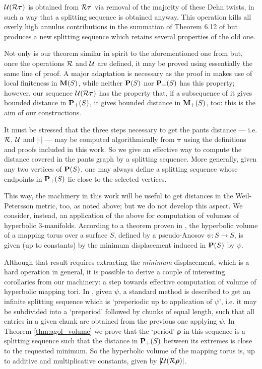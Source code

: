 ${\mathcal U}({\mathcal R}\bm\tau)$ is obtained from ${\mathcal R}\bm\tau$ via removal of the majority of these Dehn twists, in such a way that a splitting sequence is obtained anyway. This operation kills all overly high annulus contributions in the summation of Theorem 6.12 of \cite{masurminskyii} but produces a new splitting sequence which retains several properties of the old one.

Not only is our theorem similar in spirit to the aforementioned one from \cite{mms} but, once the operations ${\mathcal R}$ and ${\mathcal U}$ are defined, it may be proved using essentially the same line of proof. A major adaptation is necessary as the proof in \cite{mms} makes use of local finiteness in $\mathbf M(S)$, while neither $\mathbf P(S)$ nor ${\mathbf{P}_+}(S)$ has this property; however, our sequence ${\mathcal U}({\mathcal R}\bm\tau)$ has the property that, if a subsequence of it gives bounded distance in ${\mathbf{P}_+}(S)$, it gives bounded distance in ${\mathbf{M}_+}(S)$, too: this is the aim of our constructions.

It must be stressed that the three steps necessary to get the pants distance --- i.e. ${\mathcal R}$, ${\mathcal U}$ and $|\cdot|$ --- may be computed algorithmically from $\bm\tau$ using the definitions and proofs included in this work. So we give an effective way to compute the distance covered in the pants graph by a splitting sequence. More generally, given any two vertices of $\mathbf P(S)$, one may always define a splitting sequence whose endpoints in ${\mathbf{P}_+}(S)$ lie close to the selected vertices.

This way, the machinery in this work will be useful to get distances in the Weil-Petersson metric, too, as noted above; but we do not develop this aspect. We consider, instead, an application of the above for computation of volumes of hyperbolic 3-manifolds. According to a theorem proven in \cite{brock2}, the hyperbolic volume of a mapping torus over a surface $S$, defined by a pseudo-Anosov $\psi:S\rightarrow S$, is given (up to constants) by the minimum displacement induced in $\mathbf P(S)$ by $\psi$.

Although that result requires extracting the \emph{minimum} displacement, which is a hard operation in general, it is possible to derive a couple of interesting corollaries from our machinery: a step towards effective computation of volume of hyperbolic mapping tori. In \cite{agol_pa}, given $\psi$, a standard method is described to get an infinite splitting sequence which is `preperiodic up to application of $\psi$', i.e. it may be subdivided into a `preperiod' followed by chunks of equal length, such that all entries in a given chunk are obtained from the previous one applying $\psi$. In Theorem \ref{thm:agol_volume} we prove that the `period' $\bm\rho$ in this sequence is a splitting sequence such that the distance in ${\mathbf{P}_+}(S)$ between its extremes is close to the requested minimum. So the hyperbolic volume of the mapping torus is, up to additive and multiplicative constants, given by $|{\mathcal U}({\mathcal R}\bm\rho)|$.

